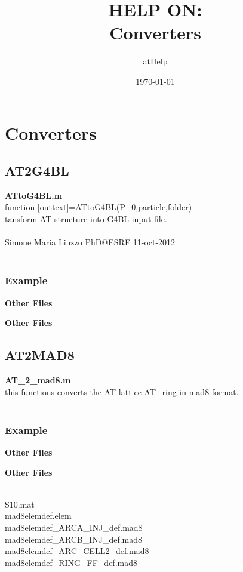 \documentclass[a4paper,12pt]{report}
\begin{document}
\title{HELP ON: \\ {\color{red!80!black} Converters}}
\author{\color{blue!80!black}atHelp}
\date{\color{green!80!black}\today}
\maketitle
\tableofcontents

\part{Converters}
\chapter{AT2G4BL}

{\bf ATtoG4BL.m}\\
  function [outtext]=ATtoG4BL(P\_0,particle,folder)\\
  tansform AT structure into G4BL input file.\\
 \\
  Simone Maria Liuzzo PhD@ESRF 11-oct-2012\\
\\
\section{Example}
{\bf  Other Files}


{\bf  Other Files}


\chapter{AT2MAD8}

{\bf AT\_2\_mad8.m}\\
  this functions converts the AT lattice AT\_ring in mad8 format.\\
\\
\section{Example}
{\bf  Other Files}


{\bf  Other Files}

 \\
S10.mat \\
mad8elemdef.elem \\
mad8elemdef\_ARCA\_INJ\_def.mad8 \\
mad8elemdef\_ARCB\_INJ\_def.mad8 \\
mad8elemdef\_ARC\_CELL2\_def.mad8 \\
mad8elemdef\_RING\_FF\_def.mad8
\end{document}
